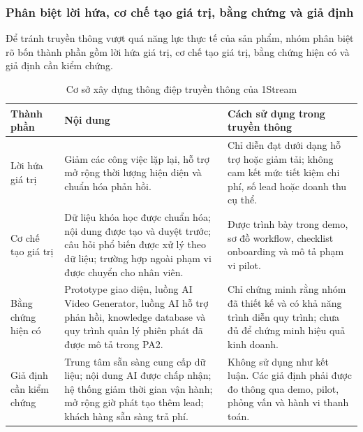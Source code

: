\subsubsection{Phân biệt lời hứa, cơ chế tạo giá trị, bằng chứng và giả định}

Để tránh truyền thông vượt quá năng lực thực tế của sản phẩm, nhóm phân biệt rõ bốn thành phần gồm lời hứa giá trị, cơ chế tạo giá trị, bằng chứng hiện có và giả định cần kiểm chứng.

\begin{table}[htbp]
    \centering
    \caption{Cơ sở xây dựng thông điệp truyền thông của 1Stream}
    \label{tab:message-evidence-assumption}
    \begin{tabular}{
        p{}
        p{}
        p{}
    }
        \hline
        \textbf{Thành phần}
        & \textbf{Nội dung}
        & \textbf{Cách sử dụng trong truyền thông} \\
        \hline

        Lời hứa giá trị
        &
        Giảm các công việc lặp lại, hỗ trợ mở rộng thời lượng hiện diện và chuẩn hóa phản hồi.
        &
        Chỉ diễn đạt dưới dạng hỗ trợ hoặc giảm tải; không cam kết mức tiết kiệm chi phí, số lead hoặc doanh thu cụ thể. \\

        \hline

        Cơ chế tạo giá trị
        &
        Dữ liệu khóa học được chuẩn hóa; nội dung được tạo và duyệt trước; câu hỏi phổ biến được xử lý theo dữ liệu; trường hợp ngoài phạm vi được chuyển cho nhân viên.
        &
        Được trình bày trong demo, sơ đồ workflow, checklist onboarding và mô tả phạm vi pilot. \\

        \hline

        Bằng chứng hiện có
        &
        Prototype giao diện, luồng AI Video Generator, luồng AI hỗ trợ phản hồi, knowledge database và quy trình quản lý phiên phát đã được mô tả trong PA2.
        &
        Chỉ chứng minh rằng nhóm đã thiết kế và có khả năng trình diễn quy trình; chưa đủ để chứng minh hiệu quả kinh doanh. \\

        \hline

        Giả định cần kiểm chứng
        &
        Trung tâm sẵn sàng cung cấp dữ liệu; nội dung AI được chấp nhận; hệ thống giảm thời gian vận hành; mở rộng giờ phát tạo thêm lead; khách hàng sẵn sàng trả phí.
        &
        Không sử dụng như kết luận. Các giả định phải được đo thông qua demo, pilot, phỏng vấn và hành vi thanh toán. \\

        \hline
    \end{tabular}
\end{table}

